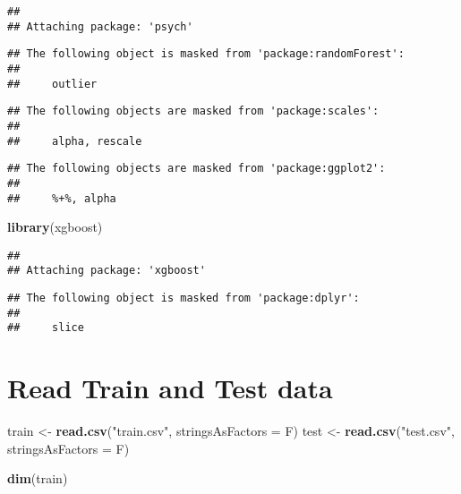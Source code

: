 \documentclass[]{article}
\newenvironment{Shaded}{\begin{snugshade}}{\end{snugshade}}
\newcommand{\KeywordTok}[1]{\textcolor[rgb]{0.13,0.29,0.53}{\textbf{#1}}}
\newcommand{\DataTypeTok}[1]{\textcolor[rgb]{0.13,0.29,0.53}{#1}}
\newcommand{\StringTok}[1]{\textcolor[rgb]{0.31,0.60,0.02}{#1}}
\newcommand{\NormalTok}[1]{#1}
\begin{document}
\begin{verbatim}
## 
## Attaching package: 'psych'
\end{verbatim}

\begin{verbatim}
## The following object is masked from 'package:randomForest':
## 
##     outlier
\end{verbatim}

\begin{verbatim}
## The following objects are masked from 'package:scales':
## 
##     alpha, rescale
\end{verbatim}

\begin{verbatim}
## The following objects are masked from 'package:ggplot2':
## 
##     %+%, alpha
\end{verbatim}

\begin{Shaded}
\begin{Highlighting}[]
\KeywordTok{library}\NormalTok{(xgboost)}
\end{Highlighting}
\end{Shaded}

\begin{verbatim}
## 
## Attaching package: 'xgboost'
\end{verbatim}

\begin{verbatim}
## The following object is masked from 'package:dplyr':
## 
##     slice
\end{verbatim}

\section{Read Train and Test data}\label{read-train-and-test-data}

\begin{Shaded}
\begin{Highlighting}[]
\NormalTok{train <-}\StringTok{ }\KeywordTok{read.csv}\NormalTok{(}\StringTok{"train.csv"}\NormalTok{, }\DataTypeTok{stringsAsFactors =}\NormalTok{ F)}
\NormalTok{test <-}\StringTok{ }\KeywordTok{read.csv}\NormalTok{(}\StringTok{"test.csv"}\NormalTok{, }\DataTypeTok{stringsAsFactors =}\NormalTok{ F)}
\end{Highlighting}
\end{Shaded}

\begin{Shaded}
\begin{Highlighting}[]
\KeywordTok{dim}\NormalTok{(train)}
\end{Highlighting}
\end{Shaded}
\end{document}
